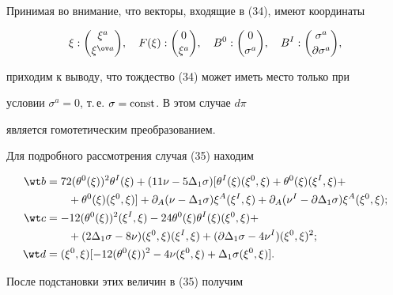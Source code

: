 Принимая во внимание, что векторы, входящие в (34), имеют координаты


$$


\xi:\binom{\xi^a}{\xi^{\ov a}},\quad


F(\xi):\binom{0}{\xi^a},\quad


B^0:\binom{0}{\sigma^a},\quad


B^I:\binom{\sigma^a}{\partial\sigma^a},


$$


приходим к выводу, что тождество (34) может иметь место только при


условии $\sigma^a=0$, т.\,е. $\sigma=\operatorname{const}$. В этом случае $d\pi$


является гомотетическим преобразованием.





Для подробного рассмотрения случая (35) находим


\begin{align*}


\wt b& =72(\theta^0(\xi))^2\theta^I(\xi)+(11\nu-5\Delta_1\sigma)


[\theta^I(\xi)(\xi^0,\xi)+\theta^0(\xi)(\xi^I,\xi)+ \\


&\qquad +\theta^0(\xi)(\xi^0,\xi)]+\partial_A(\nu-\Delta_1\sigma)


\xi^A(\xi^I,\xi)+\partial_A(\nu^I-\partial\Delta_1\sigma)


\xi^A(\xi^0,\xi); \\


\wt c& =-12(\theta^0(\xi))^2(\xi^I,\xi)-24\theta^0(\xi)


\theta^I(\xi)(\xi^0,\xi)+ \\


&\qquad +(2\Delta_1\sigma-8\nu)(\xi^0,\xi)(\xi^I,\xi)+


(\partial\Delta_1\sigma-4\nu^I)(\xi^0,\xi)^2; \\


\wt d& =(\xi^0,\xi)[-12(\theta^0(\xi))^2-4\nu(\xi^0,\xi)+


\Delta_1\sigma(\xi^0,\xi)].


\end{align*}





После подстановки этих величин в (35) получим


